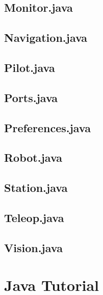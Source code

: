 \documentclass[letterpaper,10pt]{memoir}
\newcommand{\filelister}[1]{%
		
	}
\begin{document}
\newpage\section*{Monitor.java}
\filelister{Monitor.java}

\newpage\section*{Navigation.java}
\filelister{Navigation.java}

\newpage\section*{Pilot.java}
\filelister{Pilot.java}

\newpage\section*{Ports.java}
\filelister{Ports.java}

\newpage\section*{Preferences.java}
\filelister{Preferences.java}

\newpage\section*{Robot.java}
\filelister{Robot.java}

\newpage\section*{Station.java}
\filelister{Station.java}

\newpage\section*{Teleop.java}
\filelister{Teleop.java}

\newpage\section*{Vision.java}
\filelister{Vision.java}





\newpage\chapter{Java Tutorial}
\end{document}
